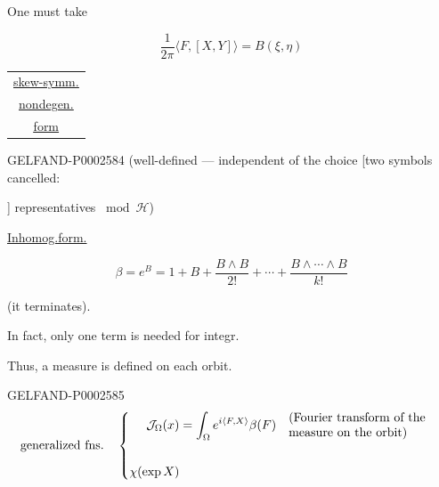 One must take

\begin{equation*}
\frac{1}{2\pi}\langle F, [X, Y]\rangle=B (\xi,\eta)
\end{equation*}

\begin{flushright}\begin{tabular}{c}
\underline{\underline{skew-symm.}}\\
\underline{\underline{nondegen.}}\\
\underline{\underline{\underline{form}}}
\end{tabular}\end{flushright}





\begin{GelfandAdjacentEvidence}{GELFAND-P000258}{4}
(well-defined --- independent of the choice [two symbols cancelled:




] representatives $\bmod\mathcal H$)
\end{GelfandAdjacentEvidence}

\underline{Inhomog.}\quad\underline{form.}

\begin{equation*}
\beta=e^B=1+B+\frac{B\wedge B}{2!}+\cdots+\frac{B\wedge\cdots\wedge B}{k!}
\end{equation*}

(it terminates).





In fact, only one term is needed for integr.

Thus, a measure is defined on each orbit.





\begin{GelfandAdjacentEvidence}{GELFAND-P000258}{5}
\begin{equation*}
\text{generalized fns.}\quad
\left\{\begin{aligned}
\mathcal J_\Omega (x)&=\int_\Omega e^{i\langle F, X\rangle}\beta (F)
\quad\text{\parbox[c]{43mm}{\raggedright (Fourier transform of the measure on the orbit)}}\\[16pt]
\chi (\exp X)&
\end{aligned}\right.
\end{equation*}

\end{GelfandAdjacentEvidence}


